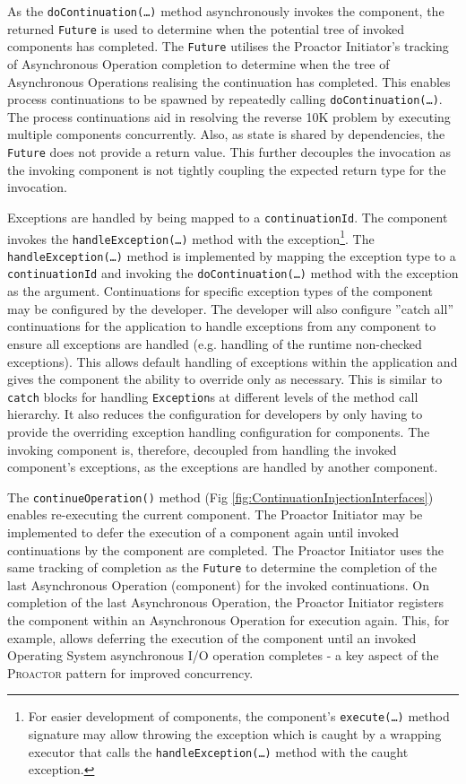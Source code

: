 \documentclass[prodmode]{style/acmlarge}
\begin{document}
As the \texttt{doContinuation(\ldots)} method asynchronously invokes the
component, the returned \texttt{Future} is used to determine when the potential
tree of invoked components has completed.  The \texttt{Future} utilises the
Proactor Initiator's tracking of Asynchronous Operation completion to determine
when the tree of Asynchronous Operations realising the continuation has
completed.  This enables process continuations \cite{process-continuation} to be
spawned by repeatedly calling \texttt{doContinuation(\ldots)}.  The process
continuations aid in resolving the reverse 10K problem
\cite{reverse-ten-k-problem} by executing multiple components concurrently.
Also, as state is shared by dependencies, the \texttt{Future} does not provide a
return value.  This further decouples the invocation as the invoking component
is not tightly coupling the expected return type for the invocation.

Exceptions are handled by being mapped to a \texttt{continuationId}.  The
component invokes the \texttt{handle\-Excep\-tion(\ldots)} method with the
exception\footnote{For easier development of components, the component's
\texttt{execute(\ldots)} method signature may allow throwing the exception which
is caught by a wrapping executor that calls the \texttt{handleException(\ldots)}
method with the caught exception.}.  The \texttt{handleException(\ldots)} method
is implemented by mapping the exception type to a \texttt{continuationId} and
invoking the \texttt{doContinuation(\ldots)} method with the exception as the argument.
Continuations for specific exception types of the component may be configured by
the developer.  The developer will also configure ''catch all'' continuations
for the application to handle exceptions from any component to ensure all
exceptions are handled (e.g. handling of the runtime non-checked exceptions).
This allows default handling of exceptions within the application and gives the
component the ability to override only as necessary.  This is similar to
\texttt{catch} blocks for handling \texttt{Exception}s at different levels of the
method call hierarchy.  It also reduces the configuration for developers by only
having to provide the overriding exception handling configuration for
components.  The invoking component is, therefore, decoupled from handling the
invoked component's exceptions, as the exceptions are handled by another
component.

The \texttt{continueOperation()} method (Fig
\ref{fig:ContinuationInjectionInterfaces}) enables re-executing the current
component.  The Proactor Initiator may be implemented to defer the execution of a
component again until invoked continuations by the component are completed.
 The Proactor Initiator uses the same tracking of completion as the
\texttt{Future} to determine the completion of the last Asynchronous Operation
(component) for the invoked continuations.  On completion of the last
Asynchronous Operation, the Proactor Initiator registers the component within an
Asynchronous Operation for execution again.  This, for example, allows deferring
the execution of the component until an invoked Operating System asynchronous
I/O operation completes - a key aspect of the \textsc{Proactor} pattern for
improved concurrency.
\end{document}
